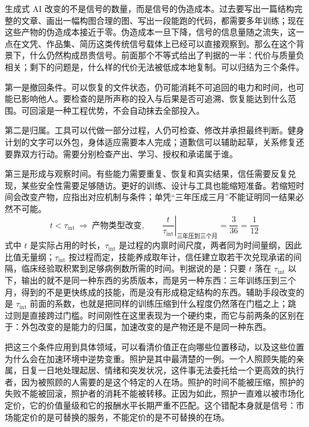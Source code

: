 
生成式 AI 改变的不是信号的数量，而是信号的伪造成本。过去要写出一篇结构完整的文章、画出一幅构图合理的图、写出一段能跑的代码，都需要多年训练；现在这些产物的伪造成本接近于零。伪造成本一旦下降，信号的信息量随之流失，这一点在文凭、作品集、简历这类传统信号载体上已经可以直接观察到。那么在这个背景下，什么仍然构成昂贵信号。前面那个不等式给出了判据的一半：代价与质量负相关；剩下的问题是，什么样的代价无法被低成本地复制。可以归结为三个条件。

第一是撤回条件。可以恢复的文件状态，仍可能消耗不可追回的电力和时间，也可能已影响他人。要检查的是所声称的投入与后果是否可追溯、恢复能达到什么范围。可回滚是一种工程优势，不会自动抹去全部投入。

第二是归属。工具可以代做一部分过程，人仍可检查、修改并承担最终判断。健身计划的文字可以外包，身体适应需要本人完成；道歉信可以辅助起草，关系修复还要靠双方行动。需要分别检查产出、学习、授权和承诺属于谁。

第三是形成与观察时间。有些能力需要重复、恢复和真实结果，信任需要反复兑现，某些安全性需要足够随访。更好的训练、设计与工具也能缩短准备。若缩短时间会改变产物，应指出对应机制与条件；单凭“三年压成三月”不能证明同一结果必然不可能。
\begin{equation}
t<\tau_{\mathrm{int}}\ \Longrightarrow\ \text{产物类型改变},
\qquad
\left.\frac{t}{\tau_{\mathrm{int}}}\right|_{\text{三年压到三个月}}=\frac{3}{36}=\frac{1}{12}
\label{eq:intrinsic-time}
\end{equation}
式中 $t$ 是实际占用的时长，$\tau_{\mathrm{int}}$ 是过程的内禀时间尺度，两者同为时间量纲，因此比值无量纲；$\tau_{\mathrm{int}}$ 按过程而定，技能养成取年计，信任建立取若干次兑现承诺的间隔，临床经验取积累到足够病例数所需的时间。判据说的是：只要 $t$ 落在 $\tau_{\mathrm{int}}$ 以下，输出的就不是同一种东西的劣质版本，而是另一种东西：三年训练压到三个月，得到的不是更快练成的技能，而是没有形成稳定结构的东西。辅助手段改变的是 $\tau_{\mathrm{int}}$ 前面的系数，也就是把同样的训练压缩到什么程度仍然落在门槛之上；跳过则是直接跨过门槛。时间刚性在这里表现为一个硬约束，而它与前两条的区别在于：外包改变的是能力的归属，加速改变的是产物还是不是同一种东西。


把这三个条件应用到具体领域，可以看清价值正在向哪些位置移动，以及这些位置为什么会在加速环境中逆势变重。照护是其中最清楚的一例。一个人照顾失能的亲属，日复一日地处理起居、情绪和突发状况，这件事无法委托给一个更高效的执行者，因为被照顾的人需要的是这个特定的人在场。照护的时间不能被压缩，照护的失败不能被回滚，照护者的消耗不能被转移。正因为如此，照护一直难以被市场化定价，它的价值量级和它的报酬水平长期严重不匹配。这个错配本身就是信号：市场能定价的是可替换的服务，不能定价的是不可替换的在场。

